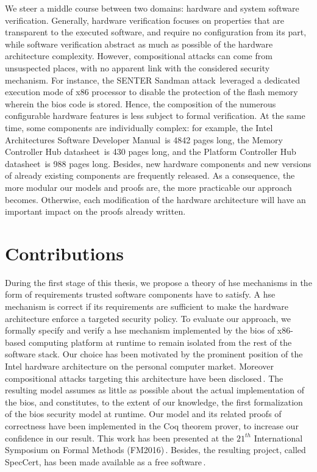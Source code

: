 We steer a middle course between two domains: hardware and system software
verification.
%
Generally, hardware verification focuses on properties that are transparent to
the executed software, and require no configuration from its part, while
software verification abstract as much as possible of the hardware architecture
complexity.
%
However, compositional attacks can come from unsuspected places, with no
apparent link with the considered security mechanism.
%
For instance, the SENTER Sandman attack\,\cite{kovah2015senter} leveraged a
dedicated execution mode of x86 processor to disable the protection of the flash
memory wherein the \ac{bios} code is stored.
%
Hence, the composition of the numerous configurable hardware features is less
subject to formal verification.
%
At the same time, some components are individually complex: for example, the
Intel Architectures Software Developer Manual\,\cite{intel2014manual} is 4842
pages long, the Memory Controller Hub datasheet\,\cite{intel2009mch} is 430
pages long, and the Platform Controller Hub datasheet\,\cite{intel2012pch} is
988 pages long.
%
Besides, new hardware components and new versions of already existing components
are frequently released.
%
As a consequence, the more modular our models and proofs are, the more
practicable our approach becomes.
%
Otherwise, each modification of the hardware architecture will have an important
impact on the proofs already written.

\section{Contributions}

During the first stage of this thesis, we propose a theory of \ac{hse}
mechanisms in the form of requirements trusted software components have to
satisfy.
%
A \ac{hse} mechanism is correct if its requirements are sufficient to make the
hardware architecture enforce a targeted security policy.
%
To evaluate our approach, we formally specify and verify a \ac{hse} mechanism
implemented by the \ac{bios} of x86-based computing platform at runtime to
remain isolated from the rest of the software stack.
%
Our choice has been motivated by the prominent position of the Intel hardware
architecture on the personal computer market.
%
Moreover compositional attacks targeting this architecture have been
disclosed\,\cite{duflot2009smram,wojtczuk2009smram,domas2015sinkhole,kallenberg2015racecondition,kovah2015senter}.
%
The resulting model assumes as little as possible about the actual
implementation of the \ac{bios}, and constitutes, to the extent of our
knowledge, the first formalization of the \ac{bios} security model at runtime.
%
Our model and its related proofs of correctness have been implemented in the Coq
theorem prover, to increase our confidence in our result.
%
This work has been presented at the $21^{th}$ International Symposium on Formal
Methods (FM2016)\,\cite{letan2016speccert}.
%
Besides, the resulting project, called SpecCert, has been made available as a
free software\,\cite{letan2016speccertcode}.


